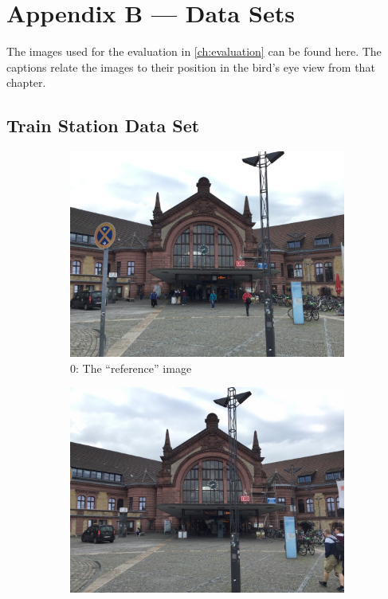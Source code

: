 \chapter{Appendix B --- Data Sets}

The images used for the evaluation in \autoref{ch:evaluation} can be found here.
The captions relate the images to their position in the bird's eye view from
that chapter.

\section{Train Station Data Set}
\FloatBarrier
\begin{figure}[h]
   \begin{subfigure}[t]{.33\textwidth}
      \includegraphics[width=\textwidth]{gfx/bahnhof_imgs/0.JPG}
      \caption{$0$: The ``reference'' image}
   \end{subfigure}
   \begin{subfigure}[t]{.33\textwidth}
      \includegraphics[width=\textwidth]{gfx/bahnhof_imgs/5.JPG}

\end{subfigure}
\end{figure}
